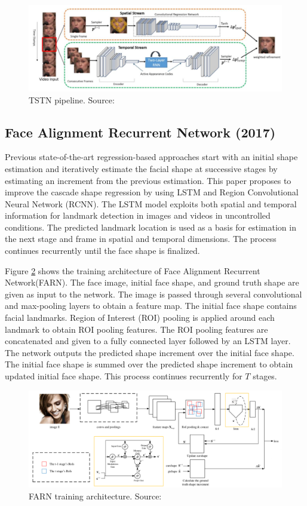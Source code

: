 \documentclass{llncs}
\begin{document}
\begin{figure}
\centering
\includegraphics[scale=0.5]{Media/TSTN}
\caption{TSTN pipeline. Source:\cite{tstn}}
\label{TSTN}
\end{figure}
\vspace{-1mm}
\subsection{Face Alignment Recurrent Network (2017) \cite{farn}}

Previous state-of-the-art regression-based approaches start with an initial shape estimation and iteratively estimate the facial shape at successive stages by estimating an increment from the previous estimation. This paper proposes to improve the cascade shape regression by using LSTM and Region Convolutional Neural Network (RCNN). The LSTM model exploits both spatial and temporal information for landmark detection in images and videos in uncontrolled conditions. The predicted landmark location is used as a basis for estimation in the next stage and frame in spatial and temporal dimensions. The process continues recurrently until the face shape is finalized. 

Figure \ref{farn_training} shows the training architecture of Face Alignment Recurrent Network(FARN). The face image, initial face shape, and ground truth shape are given as input to the network. The image is passed through several convolutional and max-pooling layers to obtain a feature map. The initial face shape contains facial landmarks. Region of Interest (ROI) pooling is applied around each landmark to obtain ROI pooling features. The ROI pooling features are concatenated and given to a fully connected layer followed by an LSTM layer. The network outputs the predicted shape increment over the initial face shape. The initial face shape is summed over the predicted shape increment to obtain updated initial face shape. This process continues recurrently for $T$ stages.

\begin{figure}
\centering
\includegraphics[scale=0.3]{Media/farn_training2}
\caption{FARN training architecture. Source:\cite{farn}}
\label{farn_training}
\end{figure}
\vspace{-1mm}
\end{document}
